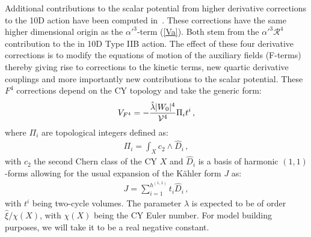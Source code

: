 \documentclass[12pt,a4paper]{book}
\newcommand{\mc}{\mathcal}
\newcommand{\V}{{\cal{V}}}
\begin{document}
Additional contributions to the scalar potential from higher derivative corrections to the 10D action have been computed in~\cite{Ciupke:2015msa}. These corrections have the same higher dimensional origin as the $\alpha'^3$-term (\ref{Va}). Both stem from the $\alpha'^3 \mc{R}^4$ contribution to the in 10D Type IIB action. The effect of these four derivative corrections is to modify the equations of motion of the auxiliary fields (F-terms) thereby giving rise to corrections to the kinetic terms, new quartic derivative couplings and more importantly new contributions to the scalar potential.  These $F^4$ corrections depend on the CY topology and take the generic form:
\begin{align}
V_{F^4} = - \frac{\hat{\lambda} |W_0|^4}{\V^4} \Pi_i t^i\,,
\label{v1}
\end{align}
where $\Pi_i$ are topological integers defined as:
\begin{align}
\Pi_i = \int_X c_2 \wedge \hat{D}_i\,,
\end{align}
with $c_2$ the second Chern class of the CY $X$ and $\hat{D}_i$ is a basis of harmonic $(1,1)$-forms allowing for the usual expansion of the K\"ahler form $J$ as:
\begin{align}
J = \sum_{i=1}^{h^{(1,1)}} t_i \hat{D}_i\,,
\end{align}
with $t^i$ being two-cycle volumes. The parameter $\hat{\lambda}$ is expected to be of order $\hat{\xi}/\chi(X)$, with $\chi(X)$ being the CY Euler number. For model building purposes, we will take it to be a real negative constant.\\
\end{document}
